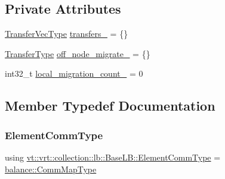 \subsection*{Private Attributes}
\begin{DoxyCompactItemize}
\item 
\hyperlink{structvt_1_1vrt_1_1collection_1_1lb_1_1_base_l_b_a329e8179ec41a1bd4924c79fe23a79af}{Transfer\+Vec\+Type} \hyperlink{structvt_1_1vrt_1_1collection_1_1lb_1_1_base_l_b_a815315640fe4e41e39d1872e115b8574}{transfers\+\_\+} = \{\}
\item 
\hyperlink{structvt_1_1vrt_1_1collection_1_1lb_1_1_base_l_b_a0a5f834082d85c558bdaf84c464c1ead}{Transfer\+Type} \hyperlink{structvt_1_1vrt_1_1collection_1_1lb_1_1_base_l_b_aa6e16e52738ab5d6f85be39641db94bd}{off\+\_\+node\+\_\+migrate\+\_\+} = \{\}
\item 
int32\+\_\+t \hyperlink{structvt_1_1vrt_1_1collection_1_1lb_1_1_base_l_b_ae2beaf58c52b6ac2ccca8ab0c266f203}{local\+\_\+migration\+\_\+count\+\_\+} = 0
\end{DoxyCompactItemize}


\subsection{Member Typedef Documentation}
\mbox{\label{structvt_1_1vrt_1_1collection_1_1lb_1_1_base_l_b_ac3f8560bfe41aa593eb7d5bd1241cc4c}} 
\subsubsection{\texorpdfstring{Element\+Comm\+Type}{ElementCommType}}
{\footnotesize\ttfamily using \hyperlink{structvt_1_1vrt_1_1collection_1_1lb_1_1_base_l_b_ac3f8560bfe41aa593eb7d5bd1241cc4c}{vt\+::vrt\+::collection\+::lb\+::\+Base\+L\+B\+::\+Element\+Comm\+Type} =  \hyperlink{namespacevt_1_1vrt_1_1collection_1_1balance_a10860c956804d644db54a16012352728}{balance\+::\+Comm\+Map\+Type}}

\mbox{\label{structvt_1_1vrt_1_1collection_1_1lb_1_1_base_l_b_aa286d31a0820a8fc9218ccb858368fca}} 

